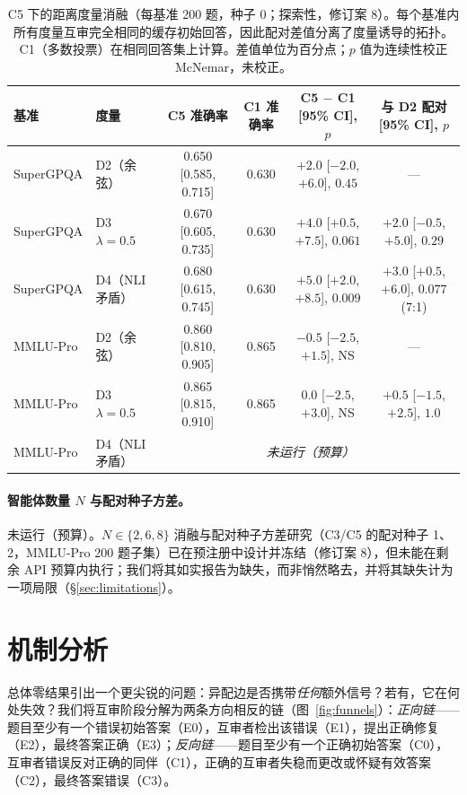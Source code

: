 \documentclass[UTF8,11pt]{ctexart}
\begin{document}
\begin{table}[t]
\centering
\small
\begin{tabular}{llcccc}
\hline
基准 & 度量 & C5 准确率 & C1 准确率 & C5 $-$ C1 [95\% CI], $p$ & 与 D2 配对 [95\% CI], $p$ \\
\hline
SuperGPQA & D2（余弦）        & 0.650 [0.585, 0.715] & 0.630 & $+2.0$ [$-2.0$, $+6.0$], $0.45$  & --- \\
SuperGPQA & D3 $\lambda{=}0.5$ & 0.670 [0.605, 0.735] & 0.630 & $+4.0$ [$+0.5$, $+7.5$], $0.061$ & $+2.0$ [$-0.5$, $+5.0$], $0.29$ \\
SuperGPQA & D4（NLI 矛盾）    & 0.680 [0.615, 0.745] & 0.630 & $+5.0$ [$+2.0$, $+8.5$], $0.009$ & $+3.0$ [$+0.5$, $+6.0$], $0.077$ (7:1) \\
MMLU-Pro  & D2（余弦）        & 0.860 [0.810, 0.905] & 0.865 & $-0.5$ [$-2.5$, $+1.5$], NS      & --- \\
MMLU-Pro  & D3 $\lambda{=}0.5$ & 0.865 [0.815, 0.910] & 0.865 & $0.0$ [$-2.5$, $+3.0$], NS       & $+0.5$ [$-1.5$, $+2.5$], $1.0$ \\
MMLU-Pro  & D4（NLI 矛盾）    & \multicolumn{4}{c}{\emph{未运行（预算）}} \\
\hline
\end{tabular}
\caption{C5 下的距离度量消融（每基准 200 题，种子 0；探索性，修订案 8）。每个基准内所有度量互审完全相同的缓存初始回答，因此配对差值分离了度量诱导的拓扑。C1（多数投票）在相同回答集上计算。差值单位为百分点；$p$ 值为连续性校正 McNemar，未校正。}
\label{tab:dist-ablation}
\end{table}

\paragraph{智能体数量 $N$ 与配对种子方差。}
未运行（预算）。$N \in \{2,6,8\}$ 消融与配对种子方差研究（C3/C5 的配对种子 1、2，MMLU-Pro 200 题子集）已在预注册中设计并冻结（修订案 8），但未能在剩余 API 预算内执行；我们将其如实报告为缺失，而非悄然略去，并将其缺失计为一项局限（\S\ref{sec:limitations}）。

\section{机制分析}
\label{sec:mechanism}

总体零结果引出一个更尖锐的问题：异配边是否携带\emph{任何}额外信号？若有，它在何处失效？我们将互审阶段分解为两条方向相反的链（图~\ref{fig:funnels}）：\emph{正向链}——题目至少有一个错误初始答案（E0），互审者检出该错误（E1），提出正确修复（E2），最终答案正确（E3）；\emph{反向链}——题目至少有一个正确初始答案（C0），互审者错误反对正确的同伴（C1），正确的互审者失稳而更改或怀疑有效答案（C2），最终答案错误（C3）。
\end{document}
